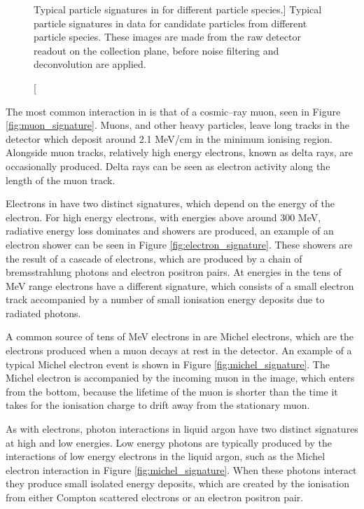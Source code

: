 \begin{figure}
	\caption
	[Typical particle signatures in \protodune{} for different particle 
	species.]
	{Typical particle signatures in \protodune{} data for candidate particles
	from different particle species. These images are made from the raw detector
	readout on the collection plane, before noise filtering and deconvolution are 
	applied. }

	\label{fig:particle_signatures}

\end{figure}

The most common interaction in \protodune{} is that of a cosmic--ray muon, seen
in Figure \ref{fig:muon_signature}. Muons, and other heavy particles, leave 
long tracks in the detector which deposit around 2.1 MeV/cm in the minimum 
ionising region. Alongside muon tracks, relatively high energy electrons, 
known as delta rays, are occasionally produced. Delta rays can be seen as 
electron activity along the length of the muon track.

Electrons in \protodune{} have two distinct signatures, which depend on the
energy of the electron. For high energy electrons, with energies above around
300 MeV, radiative energy loss dominates and showers are produced, an example 
of an electron shower can be seen in Figure \ref{fig:electron_signature}. 
These showers are the result of a cascade of electrons, which are produced by 
a chain of bremsstrahlung photons and electron positron pairs. At energies in 
the tens of MeV range electrons have a different signature, which consists of 
a small electron track accompanied by a number of small ionisation energy 
deposits due to radiated photons. 

A common source of tens of MeV electrons in \protodune{} are Michel electrons, 
which are the electrons produced when a muon decays at rest in the detector. 
An example of a typical Michel electron event is shown in Figure 
\ref{fig:michel_signature}. The Michel electron is accompanied by the incoming 
muon in the image, which enters from the bottom, because the lifetime of the 
muon is shorter than the time it takes for the ionisation charge to drift away 
from the stationary muon.

As with electrons, photon interactions in liquid argon have two distinct
signatures at high and low energies. Low energy photons are typically produced
by the interactions of low energy electrons in the liquid argon, such as the
Michel electron interaction in Figure \ref{fig:michel_signature}. When these 
photons interact they produce small isolated energy deposits, which are 
created by the ionisation from either Compton scattered electrons or an electron
positron pair.

